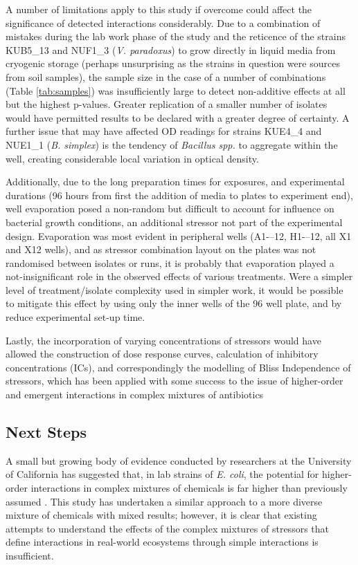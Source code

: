 \documentclass[10pt]{article}
\begin{document}
A number of limitations apply to this study if overcome could affect the significance of detected interactions considerably.  Due to a combination of mistakes during the lab work phase of the study and the reticence of the strains KUB5\_13 and NUF1\_3 (\textit{V. paradoxus}) to grow directly in liquid media from cryogenic storage (perhaps unsurprising as the strains in question were sources from soil samples), the sample size in the case of a number of combinations (Table \ref{tab:samples}) was insufficiently large to detect non-additive effects at all but the highest p-values.  Greater replication of a smaller number of isolates would have permitted results to be declared with a greater degree of certainty. A further issue that may have affected OD readings for strains KUE4\_4 and NUE1\_1 (\textit{B. simplex}) is the tendency of \textit{Bacillus spp.} to aggregate within the well, creating considerable local variation in optical density. 

Additionally, due to the long preparation times for exposures, and experimental durations (96 hours from first the addition of media to plates to experiment end), well evaporation posed a non-random but difficult to account for influence on bacterial growth conditions, an additional stressor not part of the experimental design. Evaporation was most evident in peripheral wells (A1-–12, H1-–12, all X1 and X12 wells), and as stressor combination layout on the plates was not randomised between isolates or runs, it is probably that evaporation played a not-insignificant role in the observed effects of various treatments. Were a simpler level of treatment/isolate complexity used in simpler work, it would be possible to mitigate this effect by using only the inner wells of the 96 well plate, and by reduce experimental set-up time. 

Lastly, the incorporation of varying concentrations of stressors would have allowed the construction of dose response curves, calculation of inhibitory concentrations (ICs), and correspondingly the modelling of Bliss Independence \cite{Bliss1939} of stressors, which has been applied with some success to the issue of higher-order and emergent interactions in complex mixtures of antibiotics \cite{Beppler2016,Tekin2017a} 

\subsection{Next Steps}
\label{S:4:4}

A small but growing body of evidence conducted by researchers at the University of California has suggested that, in lab strains of \textit{E. coli}, the potential for higher-order interactions in complex mixtures of chemicals is far higher than previously assumed \cite{Beppler2016,Tekin2016,Tekin2017a}.  This study has undertaken a similar approach to a more diverse mixture of chemicals with mixed results; however, it is clear that existing attempts to understand the effects of the complex mixtures of stressors that define interactions in real-world ecosystems through simple interactions is insufficient.
\end{document}
